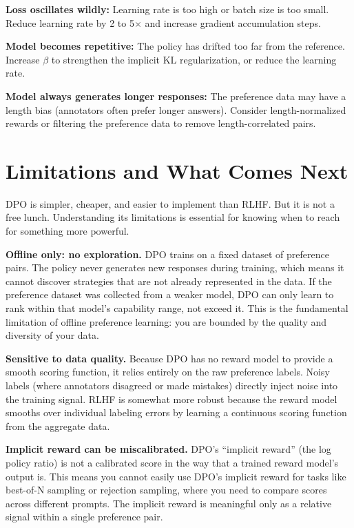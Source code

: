 \begin{chapterenv}
\begin{tipbox}
\textbf{Loss oscillates wildly:} Learning rate is too high or batch size is too small. Reduce learning rate by 2 to 5$\times$ and increase gradient accumulation steps.

\textbf{Model becomes repetitive:} The policy has drifted too far from the reference. Increase $\beta$ to strengthen the implicit KL regularization, or reduce the learning rate.

\textbf{Model always generates longer responses:} The preference data may have a length bias (annotators often prefer longer answers). Consider length-normalized rewards or filtering the preference data to remove length-correlated pairs.
\end{tipbox}

\section{Limitations and What Comes Next}

DPO is simpler, cheaper, and easier to implement than RLHF. But it is not a free lunch. Understanding its limitations is essential for knowing when to reach for something more powerful.

\textbf{Offline only: no exploration.} DPO trains on a fixed dataset of preference pairs. The policy never generates new responses during training, which means it cannot discover strategies that are not already represented in the data. If the preference dataset was collected from a weaker model, DPO can only learn to rank within that model's capability range, not exceed it. This is the fundamental limitation of offline preference learning: you are bounded by the quality and diversity of your data.

\textbf{Sensitive to data quality.} Because DPO has no reward model to provide a smooth scoring function, it relies entirely on the raw preference labels. Noisy labels (where annotators disagreed or made mistakes) directly inject noise into the training signal. RLHF is somewhat more robust because the reward model smooths over individual labeling errors by learning a continuous scoring function from the aggregate data.

\textbf{Implicit reward can be miscalibrated.} DPO's ``implicit reward'' (the log policy ratio) is not a calibrated score in the way that a trained reward model's output is. This means you cannot easily use DPO's implicit reward for tasks like best-of-N sampling or rejection sampling, where you need to compare scores across different prompts. The implicit reward is meaningful only as a relative signal within a single preference pair.


\end{chapterenv}
